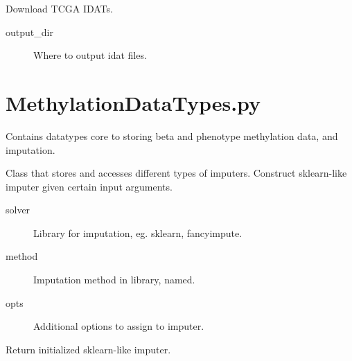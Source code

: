 \documentclass[letterpaper,10pt,english]{sphinxmanual}
\begin{document}
\begin{fulllineitems}
\begin{fulllineitems}
\label{\detokenize{index:pymethylprocess.PreProcessDataTypes.TCGADownloader.download_tcga}}
Download TCGA IDATs.
\begin{description}
\item[{output\_dir}] \leavevmode
Where to output idat files.

\end{description}

\end{fulllineitems}


\end{fulllineitems}

\label{\detokenize{index:module-pymethylprocess.MethylationDataTypes}}

\chapter{MethylationDataTypes.py}
\label{\detokenize{index:methylationdatatypes-py}}
Contains datatypes core to storing beta and phenotype methylation data, and imputation.

\begin{fulllineitems}
\label{\detokenize{index:pymethylprocess.MethylationDataTypes.ImputerObject}}
Class that stores and accesses different types of imputers.
Construct sklearn-like imputer given certain input arguments.
\begin{description}
\item[{solver}] \leavevmode
Library for imputation, eg. sklearn, fancyimpute.

\item[{method}] \leavevmode
Imputation method in library, named.

\item[{opts}] \leavevmode
Additional options to assign to imputer.

\end{description}

\begin{fulllineitems}
\label{\detokenize{index:pymethylprocess.MethylationDataTypes.ImputerObject.return_imputer}}
Return initialized sklearn-like imputer.

\end{fulllineitems}


\end{fulllineitems}
\end{document}
